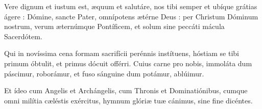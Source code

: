 Vere dignum et iustum est, æquum et salutáre,
nos tibi semper et ubíque grátias ágere :
Dómine, sancte Pater, omnípotens ætérne Deus :
per Christum Dóminum nostrum,
verum æternúmque Pontíficem,
et solum sine peccáti mácula Sacerdótem.

Qui in novíssima cena formam sacrifícii perénnis instítuens,
hóstiam se tibi primum óbtulit, et primus dócuit offérri.
Cuius carne pro nobis, immoláta dum páscimur, roborámur,
et fuso sánguine dum potámur, ablúimur.

Et ídeo cum Angelis et Archángelis,
cum Thronis et Dominatiónibus,
cumque omni milítia cæléstis exércitus,
hymnum glóriæ tuæ cánimus,
sine fine dicéntes.
